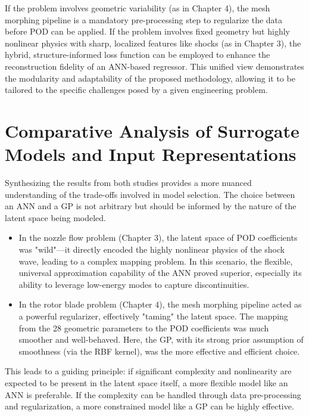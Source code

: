 \documentclass[12pt, a4paper]{report}
\begin{document}
If the problem involves geometric variability (as in Chapter 4), the mesh morphing pipeline is a mandatory pre-processing step to regularize the data before POD can be applied. If the problem involves fixed geometry but highly nonlinear physics with sharp, localized features like shocks (as in Chapter 3), the hybrid, structure-informed loss function can be employed to enhance the reconstruction fidelity of an ANN-based regressor. This unified view demonstrates the modularity and adaptability of the proposed methodology, allowing it to be tailored to the specific challenges posed by a given engineering problem.

\section{Comparative Analysis of Surrogate Models and Input Representations}
Synthesizing the results from both studies provides a more nuanced understanding of the trade-offs involved in model selection. The choice between an ANN and a GP is not arbitrary but should be informed by the nature of the latent space being modeled.
\begin{itemize}
    \item In the nozzle flow problem (Chapter 3), the latent space of POD coefficients was "wild"—it directly encoded the highly nonlinear physics of the shock wave, leading to a complex mapping problem. In this scenario, the flexible, universal approximation capability of the ANN proved superior, especially its ability to leverage low-energy modes to capture discontinuities.
    \item In the rotor blade problem (Chapter 4), the mesh morphing pipeline acted as a powerful regularizer, effectively "taming" the latent space. The mapping from the 28 geometric parameters to the POD coefficients was much smoother and well-behaved. Here, the GP, with its strong prior assumption of smoothness (via the RBF kernel), was the more effective and efficient choice.
\end{itemize}
This leads to a guiding principle: if significant complexity and nonlinearity are expected to be present in the latent space itself, a more flexible model like an ANN is preferable. If the complexity can be handled through data pre-processing and regularization, a more constrained model like a GP can be highly effective.
\end{document}
